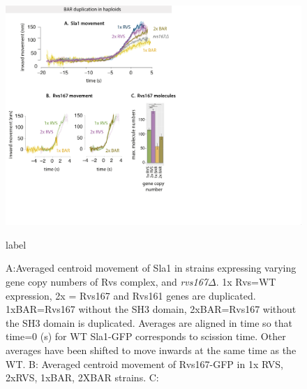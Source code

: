 		\begin{figure}
		\centering
		\includegraphics[width=25cm,height=25 cm,keepaspectratio]{figures/results_final/scaffolding_overlaid2}
		\caption [Progression of invagination with increasing BAR recruitment]
		{A:Averaged centroid movement of Sla1 in strains expressing varying gene copy numbers of Rvs complex, and \textit{rvs167$\Delta$}. 1x Rvs=WT expression, 2x = Rvs167 and Rvs161 genes are duplicated. 1xBAR=Rvs167 without the SH3 domain, 2xBAR=Rvs167 without the SH3 domain is duplicated. Averages are aligned in time so that time=0 (s) for WT Sla1-GFP corresponds to scission time. Other averages have been shifted to move inwards at the same time as the WT.
		B: Averaged centroid movement of Rvs167-GFP in 1x RVS, 2xRVS, 1xBAR, 2XBAR strains.
		C:  }
		label
		\end{figure}



